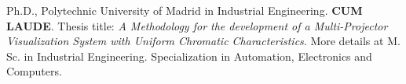 %
%
%
%



\begin{scholarship}
					{Ph.D., Polytechnic University of Madrid}
					{ in Industrial Engineering. \textbf{CUM LAUDE}. Thesis title: \emph{A Methodology for the development of a Multi-Projector Visualization System with Uniform Chromatic Characteristics}. More details at }
	\emptySeparator
					{M. Sc. in Industrial Engineering. }
					{Specialization in Automation, Electronics and Computers.}
\end{scholarship}
